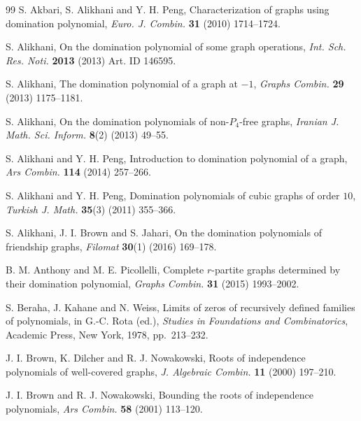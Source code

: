 \documentclass[12pt]{article}
\theoremstyle{definition}
\begin{document}
	\begin{thebibliography}{99}
		\setlength{\itemsep}{6pt}  %
		\setlength{\parskip}{0pt}
		S. Akbari, S. Alikhani and Y. H. Peng,
		Characterization of graphs using domination polynomial,
		\emph{Euro. J. Combin.} \textbf{31} (2010) 1714--1724.
		
		S. Alikhani,
		On the domination polynomial of some graph operations,
		\emph{Int. Sch. Res. Noti.} \textbf{2013} (2013) Art. ID 146595.
		
		S. Alikhani,
		The domination polynomial of a graph at $-1$,
		\emph{Graphs  Combin.} \textbf{29} (2013) 1175--1181.
		
		S. Alikhani,
		On the domination polynomials of non-$P_4$-free graphs,
		\emph{Iranian J. Math. Sci. Inform.} \textbf{8}(2) (2013) 49--55.
		
				
		S. Alikhani and Y. H. Peng,
		Introduction to domination polynomial of a graph,
		\emph{Ars Combin.} \textbf{114} (2014) 257--266.
		
		S. Alikhani and Y. H. Peng,
		Domination polynomials of cubic graphs of order $10$,
		\emph{Turkish J. Math.} \textbf{35}(3) (2011) 355--366.
		
		S. Alikhani, J. I. Brown and S. Jahari,
		On the domination polynomials of friendship graphs,
		\emph{Filomat} \textbf{30}(1) (2016) 169--178.
		
		B. M. Anthony and M. E. Picollelli,
		Complete $r$-partite graphs determined by their domination polynomial,
		\emph{Graphs Combin.} \textbf{31} (2015) 1993--2002.
		
		S. Beraha, J. Kahane and N. Weiss,
		Limits of zeros of recursively defined families of polynomials,
		in G.-C. Rota (ed.), \emph{Studies in Foundations and Combinatorics},
		Academic Press, New York, 1978, pp.~213--232.
		
		
		J. I. Brown, K. Dilcher and R. J. Nowakowski,
		Roots of independence polynomials of well-covered graphs,
		\emph{J. Algebraic Combin.} \textbf{11} (2000) 197--210.
		
		J. I. Brown and R. J. Nowakowski,
		Bounding the roots of independence polynomials,
		\emph{Ars Combin.} \textbf{58} (2001) 113--120.
		

\end{thebibliography}
\end{document}
